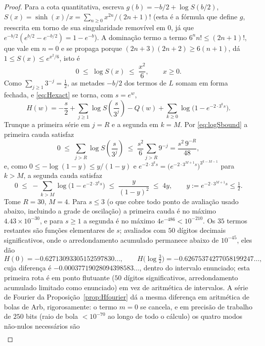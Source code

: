 \documentclass[11pt]{amsart}
\theoremstyle{plain}
\theoremstyle{definition}
\theoremstyle{remark}
\begin{document}
\begin{proof}
Para a cota quantitativa, escreva $g(b) = -b/2 + \log S(b/2)$, $S(x) = \sinh(x)/x = \sum_{n\ge0}
x^{2n}/(2n+1)!$ (esta é a fórmula que define $g$, reescrita em torno de sua singularidade removível
em $0$, já que $e^{-b/2}(e^{b/2} - e^{-b/2}) = 1-e^{-b}$). A dominação termo a termo $6^n n! \le
(2n+1)!$, que vale em $n=0$ e se propaga porque $(2n+3)(2n+2)\ge6(n+1)$, dá $1\le S(x)\le e^{x^2/6}$,
isto é
\begin{equation}
\label{eq:logSbound}
0 \;\le\; \log S(x) \;\le\; \frac{x^2}{6}, \qquad x\ge0.
\end{equation}
Como $\sum_{j\ge1}3^{-j} = \tfrac12$, as metades $-b/2$ dos termos de $L$ somam em forma fechada, e
\eqref{eq:Hexact} se torna, com $s = e^w$,
\begin{equation}
\label{eq:Hcomputable}
H(w) = -\frac s2 + \sum_{j\ge1}\log S\!\left(\frac{s}{3^j}\right) - Q(w)
+ \sum_{k\ge0}\log\bigl(1-e^{-2\cdot3^k s}\bigr).
\end{equation}
Trunque a primeira série em $j=R$ e a segunda em $k=M$. Por \eqref{eq:logSbound} a primeira cauda
satisfaz
\[
0 \;\le\; \sum_{j>R}\log S\!\left(\frac{s}{3^j}\right) \;\le\; \frac{s^2}{6}\sum_{j>R}9^{-j}
= \frac{s^2\,9^{-R}}{48},
\]
e, como $0\le-\log(1-y)\le y/(1-y)$ e $e^{-2\cdot3^ks} =
\bigl(e^{-2\cdot3^{M+1}s}\bigr)^{3^{k-M-1}}$ para $k>M$, a segunda cauda satisfaz
\[
0 \;\le\; -\sum_{k>M}\log\bigl(1-e^{-2\cdot3^ks}\bigr) \;\le\; \frac{y}{(1-y)^2} \;\le\; 4y,
\qquad y:=e^{-2\cdot3^{M+1}s}\le\tfrac12 .
\]
Tome $R=30$, $M=4$. Para $s\le3$ (o que cobre todo ponto de avaliação usado abaixo, incluindo a
grade de oscilação) a primeira cauda é no máximo $4.43\times10^{-30}$, e para $s\ge1$ a segunda é
no máximo $4e^{-486}<10^{-210}$. Os $35$ termos restantes são funções elementares de $s$; avaliados
com $50$ dígitos decimais significativos, onde o arredondamento acumulado permanece abaixo de
$10^{-45}$, eles dão
\[
H(0) = -0.62713093305152597830\ldots, \qquad H\bigl(\log\tfrac32\bigr) = -0.62675374277058199247\ldots,
\]
cuja diferença é $-0.00037719028094398583\ldots$, dentro do intervalo enunciado; esta primeira rota
é em ponto flutuante ($50$ dígitos significativos, arredondamento acumulado limitado como
enunciado) em vez de aritmética de intervalos. A série de Fourier da Proposição~\ref{prop:Hfourier}
dá a mesma diferença em aritmética de bolas de Arb, rigorosamente: o termo $m=0$ se cancela, e em
precisão de trabalho de $250$ bits (raio de bola $<10^{-70}$ ao longo de todo o cálculo) os quatro
modos não-nulos necessários são
\begin{align*}

\end{align*}
\end{proof}
\end{document}
